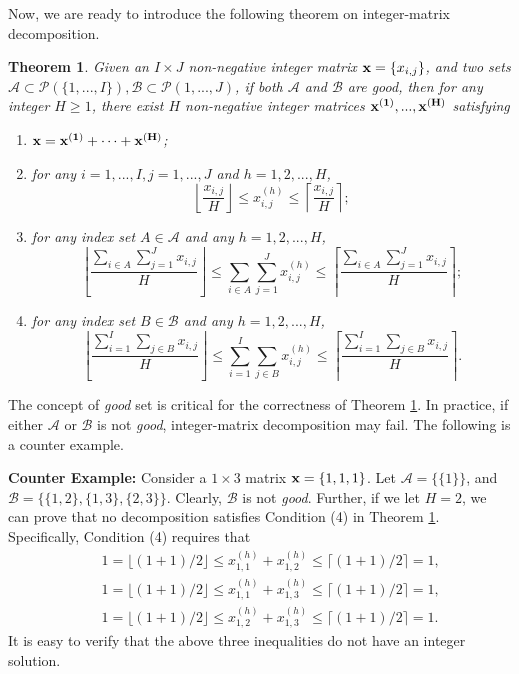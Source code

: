 \documentclass[letterpaper,twocolumn,10pt]{article}
\newtheorem{thm}{Theorem}
\begin{document}
Now, we are ready to introduce the following theorem on integer-matrix decomposition.

\begin{thm}\label{IMD}
Given an $I\times J$ non-negative integer matrix ${\bf x}=\{x_{i, j}\}$, and two sets $\mathcal{A}\subset\mathcal{P}(\{1,...,I\}), \mathcal{B}\subset\mathcal{P}(1,...,J)$, if both $\mathcal{A}$ and $\mathcal{B}$ are \emph{good}, then for any integer $H\geq 1$, there exist $H$ non-negative integer matrices ${\bf x^{(1)},...,x^{(H)}}$ satisfying
\begin{enumerate}
  \item ${\bf x}={\bf x^{(1)}+\cdots+x^{(H)}}$;
  \item for any $i=1,...,I, j=1,...,J$ and $h=1,2,...,H$,
   $$\left\lfloor \frac{x_{i,j}}{H}\right\rfloor\leq x^{(h)}_{i,j}\leq \left\lceil \frac{x_{i,j}}{H}\right\rceil;$$
  \item for any index set $A\in \mathcal{A}$ and any $h=1,2,...,H$,
   $$\left\lfloor \frac{\sum_{i\in A}\sum_{j=1}^J x_{i,j}}{H}\right\rfloor\leq\sum_{i\in A}\sum_{j=1}^J x^{(h)}_{i,j}\leq \left\lceil \frac{\sum_{i\in A}\sum_{j=1}^J x_{i,j}}{H}\right\rceil;$$
  \item for any index set $B\in \mathcal{B}$ and any $h=1,2,...,H$,
   $$\left\lfloor \frac{\sum_{i=1}^I\sum_{j\in B} x_{i,j}}{H}\right\rfloor\leq\sum_{i=1}^I\sum_{j\in B} x^{(h)}_{i,j}\leq \left\lceil \frac{\sum_{i=1}^I\sum_{j\in B} x_{i,j}}{H}\right\rceil.$$
\end{enumerate}
\end{thm}

The concept of \emph{good} set is critical for the correctness of Theorem \ref{IMD}. In practice, if either $\mathcal{A}$ or $\mathcal{B}$ is not \emph{good}, integer-matrix decomposition may fail. The following is a counter example.

\label{CounterExample} %
{\bf Counter Example:} Consider a $1\times 3$ matrix ${\bf x}=\{1, 1, 1\}$. Let $\mathcal{A}=\{\{1\}\}$, and $\mathcal{B}=\{\{1, 2\}, \{1, 3\}, \{2, 3\}\}$. Clearly, $\mathcal{B}$ is not \emph{good}. Further, if we let $H=2$, we can prove that no decomposition satisfies Condition (4) in Theorem \ref{IMD}. Specifically, Condition (4) requires that
\begin{eqnarray}
&&1 = \lfloor (1+1)/2 \rfloor \leq x^{(h)}_{1,1} + x^{(h)}_{1,2}\leq \lceil (1+1)/2 \rceil = 1,\nonumber\\
&&1 = \lfloor (1+1)/2 \rfloor \leq x^{(h)}_{1,1} + x^{(h)}_{1,3}\leq \lceil (1+1)/2 \rceil = 1,\nonumber\\
&&1 = \lfloor (1+1)/2 \rfloor \leq x^{(h)}_{1,2} + x^{(h)}_{1,3}\leq \lceil (1+1)/2 \rceil = 1.\nonumber
\end{eqnarray}
It is easy to verify that the above three inequalities do not have an integer solution.
\end{document}
